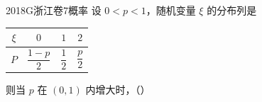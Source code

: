
\begin{problem}{2018}{G}{浙江卷}{7}{概率}
设 $ 0<p<1 $，随机变量 $ \xi $ 的分布列是
\begin{center}
\begin{tabular}{c|ccc}
$ \xi $ & $ 0 $ & $ 1 $ & $ 2 $ \\ \hline
$ P $ & $ \dfrac{1-p}{2} $ & $ \dfrac{1}{2} $ & $ \dfrac{p}{2} $
\end{tabular}
\end{center}
则当 $ p $ 在 $ (0,1) $ 内增大时，（\hspace{1cm}）
\begin{choices}
\end{choices}
\end{problem}

\begin{answer}

\end{answer}

\begin{solutions}

\end{solutions}